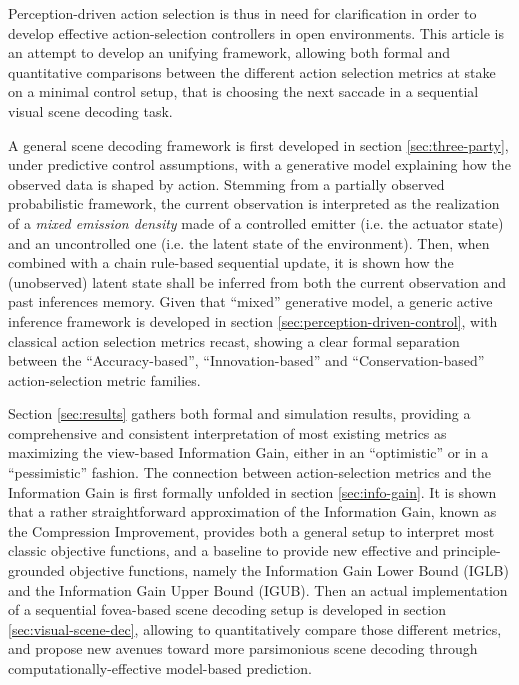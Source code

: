\documentclass[12pt,twoside,openright]{article}
\begin{document}
{\color{Purple} Perception-driven action selection is thus in need for clarification in order to develop effective action-selection controllers in open environments. This article is an attempt to develop an unifying framework, allowing both formal and quantitative comparisons between the different action selection metrics at stake on a minimal control setup, that is choosing the next saccade in a sequential visual scene decoding task.
	
A general scene decoding framework is first developed in section \ref{sec:three-party}, under predictive control assumptions, 
with a generative model explaining how the observed data is shaped by action. 
Stemming from a partially observed probabilistic framework, the current observation is interpreted as the realization of a \emph{mixed emission density} made of a controlled emitter (i.e. the actuator state) and an uncontrolled one (i.e. the latent state of the environment). Then, when combined with a chain rule-based sequential update, it is shown how the (unobserved) latent state shall be inferred from both the current observation and past inferences memory. Given that ``mixed'' generative model, a generic active inference framework is developed in section \ref{sec:perception-driven-control}, with classical action selection metrics recast, showing a clear formal separation between the ``Accuracy-based'', ``Innovation-based'' and ``Conservation-based'' action-selection metric families. 

Section \ref{sec:results} gathers  both formal and simulation results, providing a comprehensive and consistent interpretation of most existing metrics as maximizing the view-based Information Gain, either in an ``optimistic'' or in a ``pessimistic'' fashion. The connection between action-selection metrics and the Information Gain is first formally unfolded in section \ref{sec:info-gain}.  It is shown that a rather straightforward approximation of the Information Gain,
known as the Compression Improvement, provides both a general setup to interpret most classic objective functions, and a baseline to provide new effective and  principle-grounded objective functions, namely the Information Gain Lower Bound (IGLB) and the Information Gain Upper Bound (IGUB).
Then an actual implementation of a sequential fovea-based scene decoding setup
is developed in section \ref{sec:visual-scene-dec}, allowing to quantitatively compare those different metrics, and propose new avenues toward more parsimonious scene decoding through computationally-effective model-based prediction.}
\end{document}
